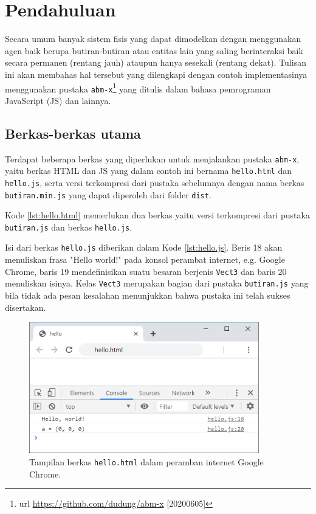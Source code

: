 \setcounter{chapter}{0}
\setcounter{page}{1}


\chapter{Pendahuluan}
Secara umum banyak sistem fisis yang dapat dimodelkan dengan menggunakan agen baik berupa butiran-butiran atau entitas lain yang saling berinteraksi baik secara permanen (rentang jauh) ataupun hanya sesekali (rentang dekat). Tulisan ini akan membahas hal tersebut yang dilengkapi dengan contoh implementasinya menggunakan pustaka \verb|abm-x|\footnote{url \url{https://github.com/dudung/abm-x} [20200605]} yang ditulis dalam bahasa pemrograman JavaScript (JS) dan lainnya.


%
\section{Berkas-berkas utama}
Terdapat beberapa berkas yang diperlukan untuk menjalankan pustaka \verb|abm-x|, yaitu berkas HTML dan JS yang dalam contoh ini bernama \verb|hello.html| dan \verb|hello.js|, serta versi terkompresi dari pustaka sebelumnya dengan nama berkas \verb|butiran.min.js| yang dapat diperoleh dari folder \verb|dist|.



Kode \ref{lst:hello.html} memerlukan dua berkas yaitu versi terkompresi dari pustaka \verb|butiran.js| dan berkas \verb|hello.js|.



Isi dari berkas \verb|hello.js| diberikan dalam Kode \ref{lst:hello.js}. Beris 18 akan menuliskan frasa "Hello world!" pada konsol perambat internet, e.g. Google Chrome, baris 19 mendefinisikan suatu besaran berjenis \verb|Vect3| dan baris 20 menuliskan isinya. Kelas \verb|Vect3| merupakan bagian dari pustaka \verb|butiran.js| yang bila tidak ada pesan kesalahan menunjukkan bahwa pustaka ini telah sukses disertakan.

\begin{figure}[H]
\centering
\includegraphics[width=10cm]{01/hello.png}
\caption{\label{fig:hello} Tampilan berkas {\tt hello.html} dalam peramban internet Google Chrome.}
\end{figure}

